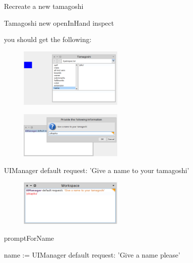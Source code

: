 \documentclass[a4paper,10pt,twoside]{book}
\begin{document}
Recreate a new tamagoshi
\begin{code}{}
Tamagoshi new openInHand inspect
\end{code}

you should get the following:

\begin{figure}
\begin{center}
\includegraphics[width=5cm]{figures/TamaWithName}
\caption{\label{fig:tomastate}}
\end{center}
\end{figure}


\begin{figure}
\begin{center}
\includegraphics[width=5cm]{figures/withPopUp}
\caption{\label{fig:tomastate}}
\end{center}
\end{figure}


\begin{code}{}
UIManager default request:  'Give a name to your tamagoshi' 
\end{code}


\begin{figure}
\begin{center}
\includegraphics[width=5cm]{figures/requestInTranscript}
\caption{\label{fig:tomastate}}
\end{center}
\end{figure}

\begin{code}{}
promptForName

	name := UIManager default request: 'Give a name please'
\end{code}
\end{document}
